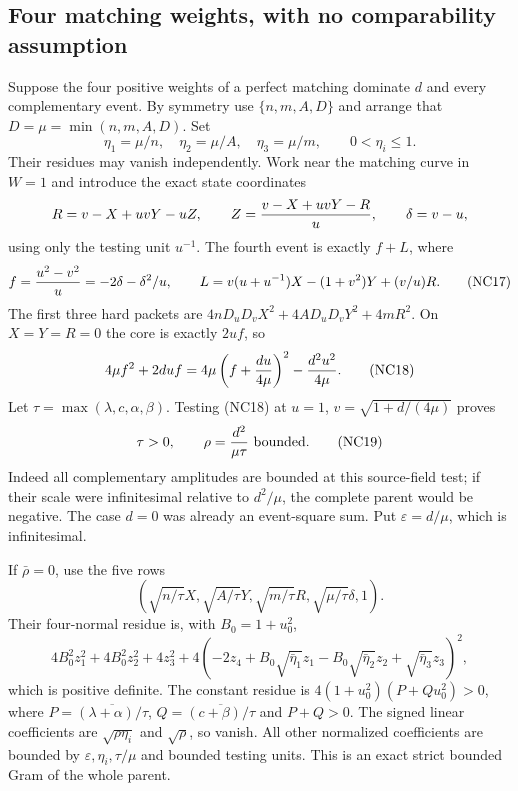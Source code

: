\subsection{Four matching weights, with no comparability assumption}

Suppose the four positive weights of a perfect matching dominate
$d$ and every complementary event. By symmetry use
$\{n,m,A,D\}$ and arrange that $D=\mu=\min(n,m,A,D)$.
Set
\[
 \eta_1=\mu/n,\quad\eta_2=\mu/A,\quad\eta_3=\mu/m,
 \qquad0<\eta_i\le1.
\]
Their residues may vanish independently. Work near the matching
curve in $W=1$ and introduce the exact state coordinates
\[
 R=v-X+uvY-uZ,\qquad
 Z={v-X+uvY-R\over u},\qquad\delta=v-u,
\]
using only the testing unit $u^{-1}$. The fourth event is exactly
$f+L$, where
\[
 f={u^2-v^2\over u}=-2\delta-\delta^2/u,\qquad
 L=v(u+u^{-1})X-(1+v^2)Y+(v/u)R.                    \tag{NC17}
\]
The first three hard packets are
$4nD_uD_vX^2+4AD_uD_vY^2+4mR^2$.
On $X=Y=R=0$ the core is exactly $2uf$, so
\[
 4\mu f^2+2duf
 =4\mu\left(f+{du\over4\mu}\right)^2
                         -{d^2u^2\over4\mu}.         \tag{NC18}
\]
Let $\tau=\max(\lambda,c,\alpha,\beta)$. Testing (NC18) at
$u=1$, $v=\sqrt{1+d/(4\mu)}$ proves
\[
 \tau>0,\qquad \rho={d^2\over\mu\tau}\text{ bounded}.
 \tag{NC19}
\]
Indeed all complementary amplitudes are bounded at this source-field
test; if their scale were infinitesimal relative to $d^2/\mu$, the
complete parent would be negative. The case $d=0$ was already an
event-square sum. Put $\varepsilon=d/\mu$, which is infinitesimal.

If $\bar\rho=0$, use the five rows
\[
 (\sqrt{n/\tau}X,\sqrt{A/\tau}Y,
       \sqrt{m/\tau}R,\sqrt{\mu/\tau}\delta,1).
\]
Their four-normal residue is, with $B_0=1+u_0^2$,
\[
4B_0^2z_1^2+4B_0^2z_2^2+4z_3^2
 +4(-2z_4+B_0\sqrt{\bar\eta_1}z_1
       -B_0\sqrt{\bar\eta_2}z_2+\sqrt{\bar\eta_3}z_3)^2,
 \tag{NC20}
\]
which is positive definite. The constant residue is
$4(1+u_0^2)(P+Qu_0^2)>0$, where
$P=\overline{(\lambda+\alpha)/\tau}$,
$Q=\overline{(c+\beta)/\tau}$ and $P+Q>0$.
The signed linear coefficients are $\sqrt{\rho\eta_i}$ and
$\sqrt\rho$, so vanish. All other normalized coefficients are
bounded by $\varepsilon,\eta_i,\tau/\mu$ and bounded testing
units. This is an exact strict bounded Gram of the whole parent.


